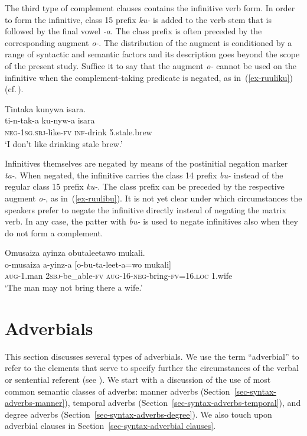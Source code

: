 The third type of complement clauses contains the infinitive verb form. 
In order to form the infinitive, class 15 prefix \textit{ku-} is added to the verb stem that is followed by the final vowel \textit{-a}. 
The class prefix is often preceded by the corresponding augment \textit{o-}. 
The distribution of the augment is conditioned by a range of syntactic and semantic factors and its description goes beyond the scope of the present study. 
Suffice it to say that the augment \textit{o-} cannot be used on the infinitive when the complement-taking predicate is negated, as in~(\ref{ex-ruuliku}) (cf.\,\citealt{Sorensenetal2020Clausal}).

\ea 	\label{ex-ruuliku} 
	\glll Tintaka kunywa isara.\\
	  ti-n-tak-a ku-nyw-a isara\\
		\textsc{neg}-\textsc{1sg.sbj}-like-\textsc{fv} \textsc{inf}-drink 5.stale.brew\\
\glt ‘I don’t like drinking stale brew.’ 
\z

Infinitives themselves are negated by means of the postinitial negation marker \textit{ta-}. 
When negated, the infinitive carries the class 14 prefix \textit{bu-} instead of the regular class 15 prefix \textit{ku-}. 
The class prefix can be preceded by the respective augment \textit{o-}, as in~(\ref{ex-ruulibu}). 
It is not yet clear under which circumstances the speakers prefer to negate the infinitive directly instead of negating the matrix verb. 
In any case, the patter with  \textit{bu-} is used to negate infinitives also when they do not form a complement.

\ea 	\label{ex-ruulibu}
	\glll Omusaiza ayinza obutaleetawo mukali.\\
	  o-musaiza a-yinz-a [o-bu-ta-leet-a=wo mukali]\\
		\textsc{aug}-1.man \textsc{2sbj}-be\_able-\textsc{fv} \textsc{aug}-16-\textsc{neg}-bring-\textsc{fv}=16.\textsc{loc} 1.wife\\
\glt ‘The man may not bring there a wife.’ 
\z


\section{Adverbials}\label{sec-syntax-adverbs}

This section discusses several types of adverbials. We use the term “adverbial” to refer to the elements that serve to specify further the circumstances of the verbal or sentential referent (see \citealt{Maienbornetal2011Adverbs}). 
We start with a discussion of the use of most common semantic classes of adverbs:  manner adverbs (Section~\ref{sec-syntax-adverbs-manner}), temporal adverbs (Section~\ref{sec-syntax-adverbs-temporal}), and degree adverbs (Section~\ref{sec-syntax-adverbs-degree}). 
We also touch upon adverbial clauses in Section~\ref{sec-syntax-adverbial clauses}.

